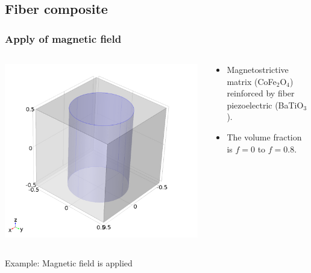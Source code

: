 \documentclass[compress]{beamer}
\begin{document}
\subsection{Fiber composite}
\begin{frame}\frametitle{Apply of magnetic field}
\begin{columns}[totalwidth=\textwidth]
   \begin{column}{.30\textwidth}
   \centering
   \includegraphics[width=0.99\textwidth]{Graphic/04_geocylin.pdf}
   \end{column}
   \begin{column}{.70\textwidth}
   \centering
   \begin{itemize}[label=$\bullet$, font=\small, leftmargin=*]
	\item Magnetostrictive matrix (CoFe$_2$O$_4$) reinforced by fiber piezoelectric (BaTiO$_3$).
	\item The volume fraction is $f=0$ to $f=0.8$.
	\end{itemize}
   \end{column}
\end{columns}
\begin{columns}[totalwidth=\textwidth]
	\begin{column}{.25\textwidth}
   \centering
   Example:
   Magnetic field is applied
   \end{column}
   \begin{column}{.35\textwidth}

\end{column}
\end{columns}
\end{frame}
\end{document}
